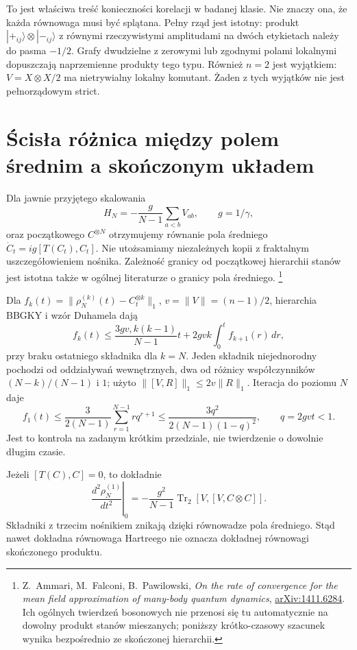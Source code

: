 \documentclass[11pt,a4paper]{article}
\newcommand{\Tr}{\operatorname{Tr}}
\begin{document}
To jest właściwa treść konieczności korelacji w badanej klasie.
Nie znaczy ona, że każda równowaga musi być splątana.
Pełny rząd jest istotny: produkt $|+_{ij}\rangle\otimes|-_{ij}\rangle$
z równymi rzeczywistymi amplitudami na dwóch etykietach należy
do pasma $-1/2$. Grafy dwudzielne z zerowymi lub zgodnymi polami
lokalnymi dopuszczają naprzemienne produkty tego typu.
Również $n=2$ jest wyjątkiem: $V=X\otimes X/2$ ma nietrywialny
lokalny komutant. Żaden z tych wyjątków nie jest pełnorządowym strict.

\section{Ścisła różnica między polem średnim a skończonym układem}

Dla jawnie przyjętego skalowania
\[
 H_N=-\frac g{N-1}\sum_{a<b}V_{ab},\qquad g=1/\gamma,
\]
oraz początkowego $C^{\otimes N}$ otrzymujemy równanie pola średniego
$\dot C_t=ig[T(C_t),C_t]$. Nie utożsamiamy niezależnych kopii
z fraktalnym uszczegółowieniem nośnika. Zależność granicy od
początkowej hierarchii stanów jest istotna także w ogólnej literaturze
o granicy pola średniego.
\footnote{Z.~Ammari, M.~Falconi, B.~Pawilowski,
\emph{On the rate of convergence for the mean field approximation of
many-body quantum dynamics}, \href{https://arxiv.org/abs/1411.6284}{arXiv:1411.6284}.
Ich ogólnych twierdzeń bosonowych nie przenosi się tu automatycznie
na dowolny produkt stanów mieszanych; poniższy krótko-czasowy szacunek
wynika bezpośrednio ze skończonej hierarchii.}

Dla $f_k(t)=\|\rho_N^{(k)}(t)-C_t^{\otimes k}\|_1$,
$v=\|V\|=(n-1)/2$, hierarchia BBGKY i wzór Duhamela dają
\[
 f_k(t)\le\frac{3gv,k(k-1)}{N-1}t
       +2gvk\int_0^t f_{k+1}(r)\,dr,
\]
przy braku ostatniego składnika dla $k=N$. Jeden składnik
niejednorodny pochodzi od oddziaływań wewnętrznych, dwa od różnicy
współczynników $(N-k)/(N-1)$ i $1$; użyto
$\|[V,R]\|_1\le2v\|R\|_1$. Iteracja do poziomu $N$ daje
\begin{equation}\label{eq:mf}
 f_1(t)\le\frac{3}{2(N-1)}\sum_{r=1}^{N-1}r q^{r+1}
 \le\frac{3q^2}{2(N-1)(1-q)^2},\qquad q=2gvt<1.
\end{equation}
Jest to kontrola na zadanym krótkim przedziale, nie twierdzenie
o dowolnie długim czasie.

Jeżeli $[T(C),C]=0$, to dokładnie
\begin{equation}\label{eq:acceleration}
 \left.\frac{d^2\rho_N^{(1)}}{dt^2}\right|_0
 =-\frac{g^2}{N-1}\Tr_2[V,[V,C\otimes C]].
\end{equation}
Składniki z trzecim nośnikiem znikają dzięki równowadze pola średniego.
Stąd nawet dokładna równowaga Hartreego nie oznacza dokładnej
równowagi skończonego produktu.
\end{document}
